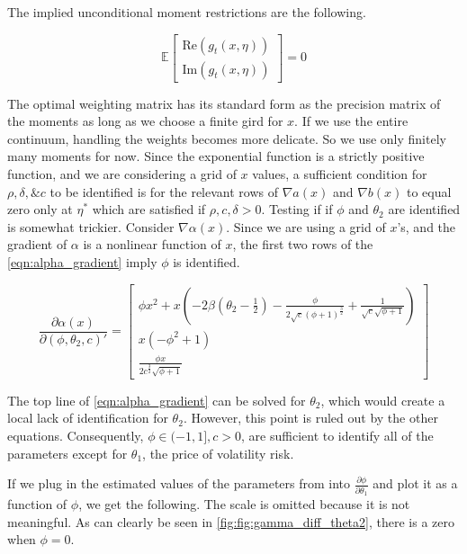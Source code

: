 \documentclass[11pt]{article}
\newcommand*{\E}{\mathbb{E}}
\begin{document}
The implied unconditional moment restrictions are the following.  

\begin{equation}
    \E \begin{bmatrix}  \mathrm{Re} (g_t(x, \eta)) \\ \mathrm{Im} (g_t(x, \eta)) \end{bmatrix} = 0
\end{equation}


The optimal weighting matrix has its standard form as the precision matrix of the moments as long as we choose a
finite gird for $x$. 
If we use the entire continuum, handling the weights becomes more delicate. 
So we use only finitely many moments for now.
Since the exponential function is a strictly positive function, and we are considering a grid of $x$ values, a
sufficient condition for $\rho, \delta, \& c$ to be identified is for the relevant rows of $\nabla a(x)$ and
$\nabla b(x)$ to equal zero only at $\eta^{*}$ which are satisfied if $\rho, c, \delta > 0$.
Testing if if $\phi$ and $\theta_2$ are identified is somewhat trickier. 
Consider $\nabla \alpha(x)$. 
Since we are using a grid of $x$'s, and the gradient of $\alpha$ is a
nonlinear function of $x$, the first two rows of the \cref{eqn:alpha_gradient} imply $\phi$ is identified.

\begin{equation}
    \label{eqn:alpha_gradient}
    \frac{\partial \alpha(x)}{\partial (\phi, \theta_2, c)'}  = \begin{bmatrix} \phi x^{2} + x \left(- 2 \beta
    \left(\theta_{2} - \frac{1}{2}\right) - \frac{\phi}{2 \sqrt{c} \left(\phi + 1\right)^{\frac{3}{2}}} +
    \frac{1}{\sqrt{c} \sqrt{\phi + 1}}\right) \\ x \left(- \phi^{2} + 1\right) \\ \frac{\phi x}{2 c^{\frac{3}{2}}
    \sqrt{\phi + 1}} \end{bmatrix} 
\end{equation}

The top line of \cref{eqn:alpha_gradient} can be solved for $\theta_2$, which would create a local lack of
identification for $\theta_2$.
However, this point is ruled out by the other equations.
Consequently,  $\phi \in (-1,1], c > 0$, are sufficient to identify all of the parameters except for $\theta_1$,
the price of volatility risk.

If we plug in the estimated values of the parameters from \textcite{khrapov2016affine} into $\frac{\partial
\phi}{\partial \theta_1}$ and plot it as a function of $\phi$,  we get the following.
The scale is omitted because it is not meaningful. 
As can clearly be seen in \cref{fig:fig:gamma_diff_theta2}, there is a zero when $\phi = 0$.
\end{document}
